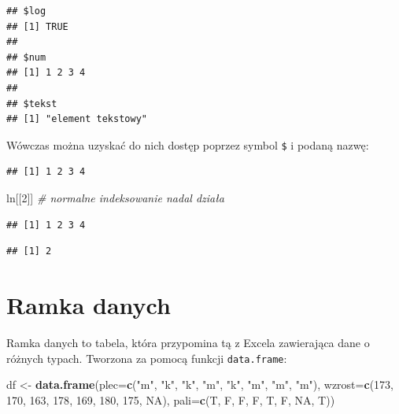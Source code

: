 \documentclass[]{book}
\newenvironment{Shaded}{\begin{snugshade}}{\end{snugshade}}
\newcommand{\KeywordTok}[1]{\textcolor[rgb]{0.13,0.29,0.53}{\textbf{#1}}}
\newcommand{\DataTypeTok}[1]{\textcolor[rgb]{0.13,0.29,0.53}{#1}}
\newcommand{\DecValTok}[1]{\textcolor[rgb]{0.00,0.00,0.81}{#1}}
\newcommand{\StringTok}[1]{\textcolor[rgb]{0.31,0.60,0.02}{#1}}
\newcommand{\CommentTok}[1]{\textcolor[rgb]{0.56,0.35,0.01}{\textit{#1}}}
\newcommand{\OtherTok}[1]{\textcolor[rgb]{0.56,0.35,0.01}{#1}}
\newcommand{\OperatorTok}[1]{\textcolor[rgb]{0.81,0.36,0.00}{\textbf{#1}}}
\newcommand{\NormalTok}[1]{#1}
\begin{document}
\begin{verbatim}
## $log
## [1] TRUE
## 
## $num
## [1] 1 2 3 4
## 
## $tekst
## [1] "element tekstowy"
\end{verbatim}

Wówczas można uzyskać do nich dostęp poprzez symbol \texttt{\$} i podaną
nazwę:

\begin{Shaded}
\end{Shaded}

\begin{verbatim}
## [1] 1 2 3 4
\end{verbatim}

\begin{Shaded}
\begin{Highlighting}[]
\NormalTok{ln[[}\DecValTok{2}\NormalTok{]] }\CommentTok{# normalne indeksowanie nadal działa}
\end{Highlighting}
\end{Shaded}

\begin{verbatim}
## [1] 1 2 3 4
\end{verbatim}

\begin{Shaded}
\end{Shaded}

\begin{verbatim}
## [1] 2
\end{verbatim}

\section{Ramka danych}\label{ramka-danych}

Ramka danych to tabela, która przypomina tą z Excela zawierająca dane o
różnych typach. Tworzona za pomocą funkcji \texttt{data.frame}:

\begin{Shaded}
\begin{Highlighting}[]
\NormalTok{df <-}\StringTok{ }\KeywordTok{data.frame}\NormalTok{(}\DataTypeTok{plec=}\KeywordTok{c}\NormalTok{(}\StringTok{"m"}\NormalTok{, }\StringTok{"k"}\NormalTok{, }\StringTok{"k"}\NormalTok{, }\StringTok{"m"}\NormalTok{, }\StringTok{"k"}\NormalTok{, }\StringTok{"m"}\NormalTok{, }\StringTok{"m"}\NormalTok{, }\StringTok{"m"}\NormalTok{),}
                 \DataTypeTok{wzrost=}\KeywordTok{c}\NormalTok{(}\DecValTok{173}\NormalTok{, }\DecValTok{170}\NormalTok{, }\DecValTok{163}\NormalTok{, }\DecValTok{178}\NormalTok{, }\DecValTok{169}\NormalTok{, }\DecValTok{180}\NormalTok{, }\DecValTok{175}\NormalTok{, }\OtherTok{NA}\NormalTok{),}
                 \DataTypeTok{pali=}\KeywordTok{c}\NormalTok{(T, F, F, F, T, F, }\OtherTok{NA}\NormalTok{, T))}
\end{Highlighting}
\end{Shaded}
\end{document}
